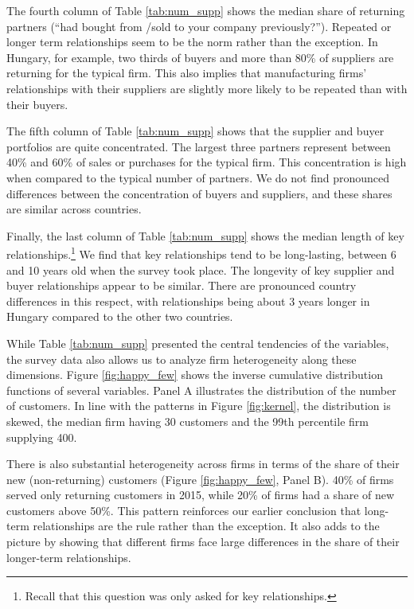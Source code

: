 \documentclass[final, dvipsnames, authoryear,12pt]{elsarticle}
\begin{document}
The fourth column of Table \ref{tab:num_supp} shows the median share of returning partners (``had bought from /sold to your company previously?''). Repeated or longer term relationships seem to be the norm rather than the exception. In Hungary, for example, two thirds of buyers and more than 80\% of suppliers are returning for the typical firm. This also implies that manufacturing firms' relationships with their suppliers are slightly more likely to be repeated than with their buyers.

The fifth column of Table \ref{tab:num_supp} shows that the supplier and buyer portfolios are quite concentrated. The largest three partners represent between 40\% and 60\% of sales or purchases for the typical firm. This concentration is high when compared to the typical number of partners. We do not find pronounced differences between the concentration of buyers and suppliers, and these shares are similar across countries.

Finally, the last column of Table \ref{tab:num_supp} shows the median length of key relationships.\footnote{Recall that this question was only asked for key relationships.} We find that key relationships tend to be long-lasting, between 6 and 10 years old when the survey took place. The longevity of key supplier and buyer relationships appear to be similar. There are pronounced country differences in this respect, with relationships being about 3 years longer in Hungary compared to the other two countries. 

While Table \ref{tab:num_supp} presented the central tendencies of the variables, the survey data also allows us to analyze firm heterogeneity along these dimensions. Figure \ref{fig:happy_few} shows the inverse cumulative distribution functions of several variables. Panel A illustrates the distribution of the number of customers. In line with the patterns in Figure \ref{fig:kernel}, the distribution is skewed, the median firm having 30 customers and the 99th percentile firm supplying 400.

There is also substantial heterogeneity across firms in terms of the share of their new (non-returning) customers (Figure \ref{fig:happy_few}, Panel B). 40\% of firms served only returning customers in 2015, while 20\% of firms had a share of new customers above 50\%. This pattern reinforces our earlier conclusion that long-term relationships are the rule rather than the exception. It also adds to the picture by showing that different firms face large differences in the share of their longer-term relationships.
\end{document}
